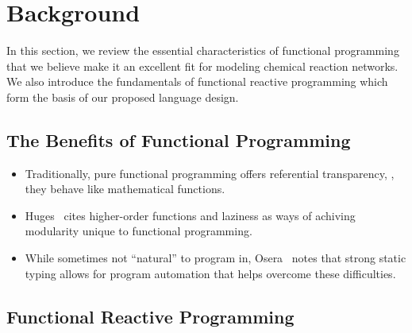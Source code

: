 
\section{Background}
\label{sec:frp_background}

In this section, we review the essential characteristics of functional programming that we believe make it an excellent fit for modeling chemical reaction networks.
We also introduce the fundamentals of functional reactive programming which form the basis of our proposed language design.

\subsection{The Benefits of Functional Programming}

\begin{itemize}
  \item Traditionally, pure functional programming offers referential transparency, \ie, they behave like mathematical functions.
  \item Huges~\cite{huges:1990} cites higher-order functions and laziness as ways of achiving modularity unique to functional programming.
  \item While sometimes not ``natural'' to program in, Osera~\cite{osera:thesis:2015} notes that strong static typing allows for program automation that helps overcome these difficulties.
\end{itemize}

\subsection{Functional Reactive Programming}


